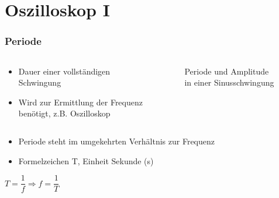 
\section{Oszilloskop I}
\label{section:oszilloskop_1}
\begin{frame}%

\frametitle{Periode}
\begin{columns}
    \begin{column}{0.48\textwidth}
    \begin{itemize}
  \item Dauer einer vollständigen Schwingung
  \item Wird zur Ermittlung der Frequenz benötigt, z.B. Oszilloskop
  \end{itemize}

    \end{column}
   \begin{column}{0.48\textwidth}
       
\begin{figure}
    \caption{\scriptsize Periode und Amplitude in einer Sinusschwingung}
    \label{e_periode_amplitude}
\end{figure}


   \end{column}
\end{columns}

\end{frame}

\begin{frame}\begin{itemize}
  \item Periode steht im umgekehrten Verhältnis zur Frequenz
  \item Formelzeichen T, Einheit Sekunde (s)
  \end{itemize}
    \pause
    $T = \dfrac{1}{f} \Rightarrow f = \dfrac{1}{T}$



\end{frame}

\begin{frame}\end{frame}

\begin{frame}
\end{frame}

